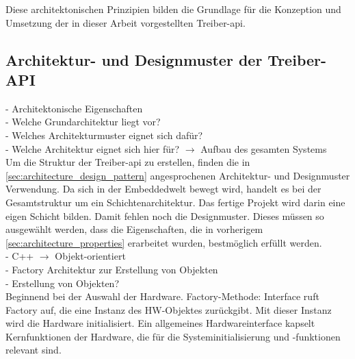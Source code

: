 Diese architektonischen Prinzipien bilden die Grundlage für die Konzeption und Umsetzung der in dieser Arbeit vorgestellten Treiber-\gls{api}.


\subsection{Architektur- und Designmuster der Treiber-API}


- Architektonische Eigenschaften\\
- Welche Grundarchitektur liegt vor?\\
- Welches Architekturmuster eignet sich dafür?\\
- Welche Architektur eignet sich hier für? $\rightarrow$ Aufbau des gesamten Systems\\
Um die Struktur der Treiber-\gls{api} zu erstellen, finden die in \cref{sec:architecture_design_pattern} angesprochenen Architektur- und Designmuster Verwendung.
Da sich in der Embeddedwelt bewegt wird, handelt es bei der Gesamtstruktur um ein Schichtenarchitektur.
Das fertige Projekt wird darin eine eigen Schicht bilden.
Damit fehlen noch die Designmuster.
Dieses müssen so ausgewählt werden, dass die Eigenschaften, die in vorherigem \cref{sec:architecture_properties} erarbeitet wurden, bestmöglich erfüllt werden.\\
- C++ $\rightarrow$ Objekt-orientiert\\
- Factory Architektur zur Erstellung von Objekten\\
- Erstellung von Objekten?\\
Beginnend bei der Auswahl der Hardware. 
Factory-Methode:
Interface ruft Factory auf, die eine Instanz des HW-Objektes zurückgibt.
Mit dieser Instanz wird die Hardware initialisiert.
Ein allgemeines Hardwareinterface kapselt Kernfunktionen der Hardware, die für die Systeminitialisierung und -funktionen relevant sind.


